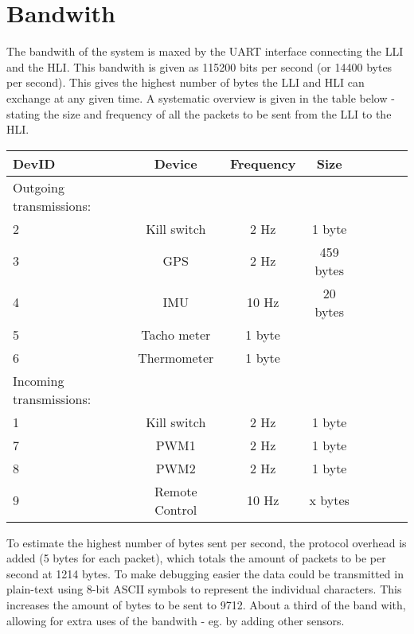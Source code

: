 \section{Bandwith}
The bandwith of the system is maxed by the UART interface connecting the \ac{LLI} and the \ac{HLI}. This bandwith is given as 115200 bits per second (or 14400 bytes per second). This gives the highest number of bytes the \ac{LLI} and \ac{HLI} can exchange at any given time. A systematic overview is given in the table below - stating the size and frequency of all the packets to be sent from the \ac{LLI} to the \ac{HLI}. 

\begin{tabular}{l*{6}{c}r}
DevID          & Device & Frequency & Size\\
\hline
Outgoing transmissions:\\
\hline
2 & Kill switch & 2 Hz & 1 byte\\
3 & GPS & 2 Hz & 459 bytes\\
4 & IMU & 10 Hz & 20 bytes\\
5 & Tacho meter & 1 byte\\
6 & Thermometer & 1 byte\\
\hline
Incoming transmissions:\\
\hline
1 & Kill switch & 2 Hz & 1 byte\\
7 & PWM1 & 2 Hz & 1 byte\\
8 & PWM2 & 2 Hz & 1 byte\\
9 & Remote Control & 10 Hz & x bytes\\
\end{tabular}

To estimate the highest number of bytes sent per second, the protocol overhead is added (5 bytes for each packet), which totals the amount of packets to be per second at 1214 bytes. To make debugging easier the data could be transmitted in plain-text using 8-bit ASCII symbols to represent the individual characters. This increases the amount of bytes to be sent to 9712. About a third of the band with, allowing for extra uses of the bandwith - eg. by adding other sensors. 